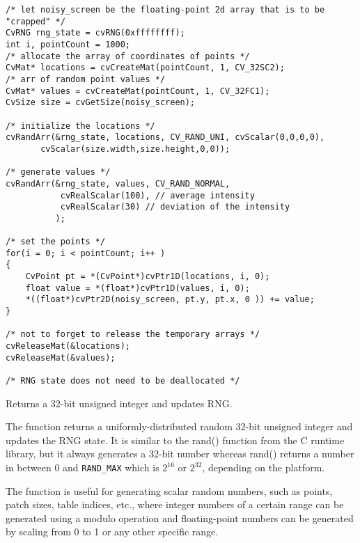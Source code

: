 \begin{lstlisting}
/* let noisy_screen be the floating-point 2d array that is to be "crapped" */
CvRNG rng_state = cvRNG(0xffffffff);
int i, pointCount = 1000;
/* allocate the array of coordinates of points */
CvMat* locations = cvCreateMat(pointCount, 1, CV_32SC2);
/* arr of random point values */
CvMat* values = cvCreateMat(pointCount, 1, CV_32FC1);
CvSize size = cvGetSize(noisy_screen);

/* initialize the locations */
cvRandArr(&rng_state, locations, CV_RAND_UNI, cvScalar(0,0,0,0), 
	   cvScalar(size.width,size.height,0,0));

/* generate values */
cvRandArr(&rng_state, values, CV_RAND_NORMAL,
           cvRealScalar(100), // average intensity
           cvRealScalar(30) // deviation of the intensity
          );

/* set the points */
for(i = 0; i < pointCount; i++ )
{
    CvPoint pt = *(CvPoint*)cvPtr1D(locations, i, 0);
    float value = *(float*)cvPtr1D(values, i, 0);
    *((float*)cvPtr2D(noisy_screen, pt.y, pt.x, 0 )) += value;
}

/* not to forget to release the temporary arrays */
cvReleaseMat(&locations);
cvReleaseMat(&values);

/* RNG state does not need to be deallocated */
\end{lstlisting}
\fi

Returns a 32-bit unsigned integer and updates RNG.


\begin{description}
\end{description}

The function returns a uniformly-distributed random
32-bit unsigned integer and updates the RNG state. It is similar to the rand()
function from the C runtime library, but it always generates a 32-bit number
whereas rand() returns a number in between 0 and \texttt{RAND\_MAX}
which is $2^{16}$ or $2^{32}$, depending on the platform.

The function is useful for generating scalar random numbers, such as
points, patch sizes, table indices, etc., where integer numbers of a certain
range can be generated using a modulo operation and floating-point numbers
can be generated by scaling from 0 to 1 or any other specific range.

